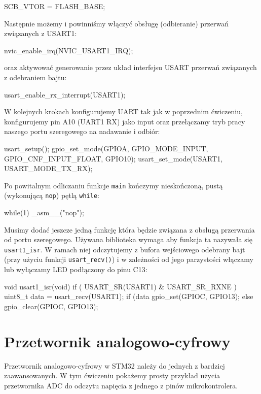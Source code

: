 \documentclass{pdfBooklets}
\begin{document}
\begin{CodeFrame*}[c]{}
  SCB_VTOR = FLASH_BASE;
\end{CodeFrame*}

Następnie możemy i powinniśmy włączyć obsługę (odbieranie) przerwań związanych z USART1:

\begin{CodeFrame*}[c]{}
  nvic_enable_irq(NVIC_USART1_IRQ);
\end{CodeFrame*}
oraz aktywować generowanie przez układ interfejsu USART przerwań związanych z odebraniem bajtu:

\begin{CodeFrame*}[c]{}
  usart_enable_rx_interrupt(USART1);
\end{CodeFrame*}

W kolejnych krokach konfigurujemy UART tak jak w poprzednim ćwiczeniu, konfigurujemy pin A10 (UART1 RX) jako input oraz przełączamy tryb pracy naszego portu szeregowego na nadawanie i odbiór:

\begin{CodeFrame*}[c]{}
  usart_setup();
  gpio_set_mode(GPIOA, GPIO_MODE_INPUT, GPIO_CNF_INPUT_FLOAT, GPIO10);
  usart_set_mode(USART1, USART_MODE_TX_RX);
\end{CodeFrame*}

Po powitalnym odliczaniu funkcje \Verb$main$ kończymy nieskończoną, pustą (wykonującą \Verb$nop$) pętlą \Verb$while$:

\begin{CodeFrame*}[c]{}
  while(1)
      _asm__("nop");
\end{CodeFrame*}

Musimy dodać jeszcze jedną funkcję która będzie związana z obsługą przerwania od portu szeregowego.
Używana biblioteka wymaga aby funkcja ta nazywała się \Verb#usart1_isr#.
W ramach niej odczytujemy z bufora wejściowego odebrany bajt (przy użyciu funkcji \Verb$usart_recv()$) i w zależności od jego parzystości włączamy lub wyłączamy LED podłączony do pinu C13:

\begin{CodeFrame*}[c]{}
  void usart1_isr(void) {
    if ( USART_SR(USART1) & USART_SR_RXNE ) {
      uint8_t data = usart_recv(USART1);
      if (data%
        gpio_set(GPIOC, GPIO13);
      else
        gpio_clear(GPIOC, GPIO13);
    }
  }
\end{CodeFrame*}



\section{Przetwornik analogowo-cyfrowy}
Przetwornik analogowo-cyfrowy w STM32 należy do jednych z bardziej zaawansowanych. W tym ćwiczeniu pokażemy prosty przykład
użycia przetwornika ADC do odczytu napięcia z jednego z pinów mikrokontrolera.
\end{document}
